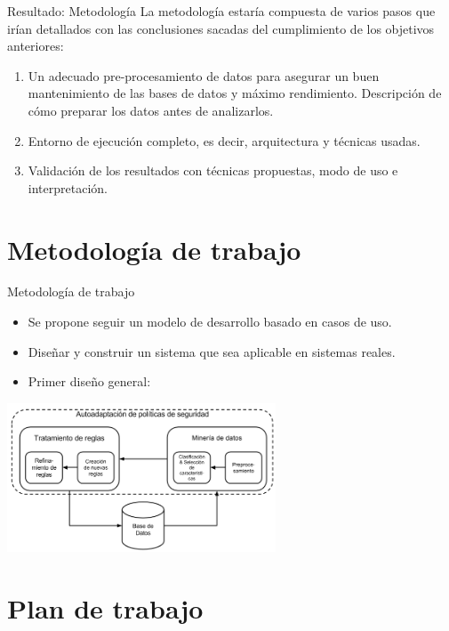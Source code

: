 \documentclass{beamer}
\begin{document}
\begin{frame}{Resultado: Metodología}
La metodología estaría compuesta de varios pasos que irían detallados con las conclusiones sacadas del cumplimiento de los objetivos anteriores:

\begin{enumerate}
  \item<1-> Un adecuado pre-procesamiento de datos para asegurar un buen mantenimiento de las bases de datos y máximo rendimiento. Descripción de cómo preparar los datos antes de analizarlos.
  \item<2-> Entorno de ejecución completo, es decir, arquitectura y técnicas usadas.
  \item<3-> Validación de los resultados con técnicas propuestas, modo de uso e interpretación.
\end{enumerate}

\end{frame}

\section{Metodología de trabajo}

\begin{frame}{Metodología de trabajo}

\begin{itemize}
  \item<1-> Se propone seguir un modelo de desarrollo basado en casos de uso.
  \item<2-> Diseñar y construir un sistema que sea aplicable en sistemas reales.
  \item<3-> Primer diseño general:
\end{itemize}

\begin{center}
\includegraphics[width=0.6\textwidth]{./imgs/KRS.png}
\end{center}

\end{frame}

\section{Plan de trabajo}
\end{document}
